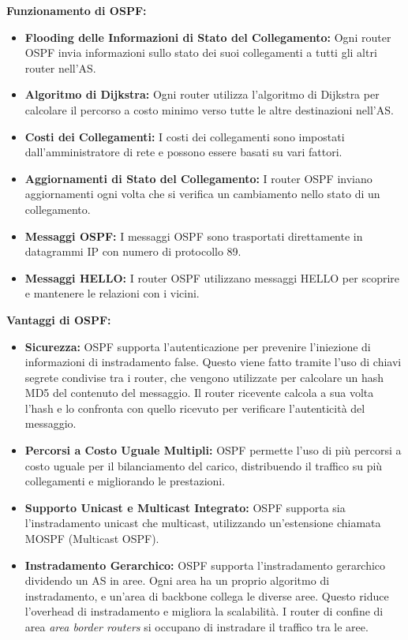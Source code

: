 \noindent \textbf{Funzionamento di OSPF:}
\begin{itemize}
    \item \textbf{Flooding delle Informazioni di Stato del Collegamento:} Ogni router OSPF invia informazioni sullo stato dei suoi collegamenti a tutti gli altri router nell'AS.
    \item \textbf{Algoritmo di Dijkstra:} Ogni router utilizza l'algoritmo di Dijkstra per calcolare il percorso a costo minimo verso tutte le altre destinazioni nell'AS.
    \item \textbf{Costi dei Collegamenti:} I costi dei collegamenti sono impostati dall'amministratore di rete e possono essere basati su vari fattori.
    \item \textbf{Aggiornamenti di Stato del Collegamento:} I router OSPF inviano aggiornamenti ogni volta che si verifica un cambiamento nello stato di un collegamento.
    \item \textbf{Messaggi OSPF:} I messaggi OSPF sono trasportati direttamente in datagrammi IP con numero di protocollo 89.
    \item \textbf{Messaggi HELLO:} I router OSPF utilizzano messaggi HELLO per scoprire e mantenere le relazioni con i vicini.
\end{itemize}

\noindent \textbf{Vantaggi di OSPF:}
\begin{itemize}
    \item \textbf{Sicurezza:} OSPF supporta l'autenticazione per prevenire l'iniezione di informazioni di instradamento false. Questo viene fatto tramite l'uso di chiavi segrete condivise tra i router, che vengono utilizzate per calcolare un hash MD5 del contenuto del messaggio. Il router ricevente calcola a sua volta l'hash e lo confronta con quello ricevuto per verificare l'autenticità del messaggio.
    \item \textbf{Percorsi a Costo Uguale Multipli:} OSPF permette l'uso di più percorsi a costo uguale per il bilanciamento del carico, distribuendo il traffico su più collegamenti e migliorando le prestazioni.
    \item \textbf{Supporto Unicast e Multicast Integrato:} OSPF supporta sia l'instradamento unicast che multicast, utilizzando un'estensione chiamata MOSPF (Multicast OSPF).
    \item \textbf{Instradamento Gerarchico:} OSPF supporta l'instradamento gerarchico dividendo un AS in aree. Ogni area ha un proprio algoritmo di instradamento, e un'area di backbone collega le diverse aree. Questo riduce l'overhead di instradamento e migliora la scalabilità. I router di confine di area \textit{area border routers} si occupano di instradare il traffico tra le aree.
\end{itemize}

